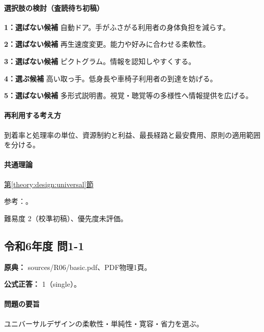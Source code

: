 \paragraph{選択肢の検討（査読待ち初稿）}\mbox{}\par

\noindent\textbf{1：選ばない候補} 自動ドア。手がふさがる利用者の身体負担を減らす。\par

\noindent\textbf{2：選ばない候補} 再生速度変更。能力や好みに合わせる柔軟性。\par

\noindent\textbf{3：選ばない候補} ピクトグラム。情報を認知しやすくする。\par

\noindent\textbf{4：選ぶ候補} 高い取っ手。低身長や車椅子利用者の到達を妨げる。\par

\noindent\textbf{5：選ばない候補} 多形式説明書。視覚・聴覚等の多様性へ情報提供を広げる。\par

\paragraph{再利用する考え方} 到着率と処理率の単位、資源制約と利益、最長経路と最安費用、原則の適用範囲を分ける。

\paragraph{共通理論} \hyperref[theory:design:universal]{第\ref*{theory:design:universal}節}

\par 参考：\cite{design48_ud}。

\par 難易度 2（校準初稿）、優先度未評価。

\subsection{令和6年度 問1-1}
\label{q:r06-reg-basic-1-1}

\noindent\textbf{原典：} sources/R06/basic.pdf、PDF物理1頁。

\textbf{公式正答：} 1（single）。

\paragraph{問題の要旨} ユニバーサルデザインの柔軟性・単純性・寛容・省力を選ぶ。

